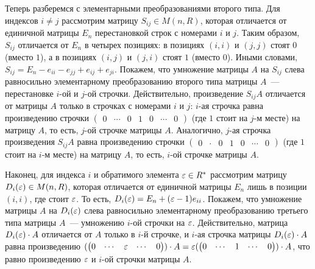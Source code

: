Теперь разберемся с элементарными преобразованиями второго
типа. Для индексов $i\neq j$ рассмотрим матрицу $S_{ij}\in M(n,R)$, которая
отличается от единичной матрицы $E_n$ перестановкой строк с номерами
$i$ и $j$. Таким образом, $S_{ij}$ отличается от $E_n$ в четырех
позициях: в позициях $(i,i)$ и $(j,j)$ стоят $0$ (вместо $1$), а в позициях $(i,j)$
и $(j,i)$ стоят $1$ (вместо $0$). Иными словами,
$S_{ij}=E_n-e_{ii}-e_{jj}+e_{ij}+e_{ji}$.
Покажем, что умножение матрицы $A$ на $S_{ij}$ слева равносильно
элементарному преобразованию второго типа матрицы $A$~--- перестановке
$i$-ой и $j$-ой строчки.
Действительно, произведение $S_{ij}A$ отличается от матрицы $A$ только
в строчках с номерами $i$ и $j$: $i$-ая строчка равна произведению
строчки $(\begin{matrix} 0 & \cdots & 0 & 1 & 0 & \cdots &
  0\end{matrix})$ (где $1$ стоит на $j$-м месте) на матрицу $A$, то
есть, $j$-ой строчке матрицы $A$. Аналогично, $j$-ая строчка
произведения $S_{ij}A$ равна произведению строчки $(\begin{matrix} 0 &
  \cdot & 0 & 1 & 0 & \cdots & 0\end{matrix})$ (где $1$ стоит на $i$-м
месте) на матрицу $A$, то есть, $i$-ой строчке матрицы $A$.

Наконец, для индекса $i$ и обратимого элемента $\varepsilon\in R^*$
рассмотрим матрицу $D_i(\varepsilon)\in M(n,R)$, которая отличается от
единичной матрицы $E_n$ лишь в позиции $(i,i)$, где стоит $\varepsilon$. То
есть, $D_i(\varepsilon)=E_n+(\varepsilon-1)e_{ii}$. Покажем, что умножение матрицы
$A$ на $D_i(\varepsilon)$ слева равносильно элементарному преобразованию
третьего типа матрицы $A$~--- умножению $i$-ой строчки на
$\varepsilon$. Действительно, матрица $D_i(\varepsilon)\cdot A$ отличается от $A$
только в $i$-й строчке, и $i$-ая строчка матрицы $D_i(\varepsilon)\cdot A$
равна произведению $(\begin{pmatrix}0 & \cdots & \varepsilon & \cdots &
  0\end{pmatrix})\cdot A=\varepsilon(\begin{pmatrix}0 & \cdots & 1 & \cdots
  & 0\end{pmatrix})\cdot A$, что равно произведению $\varepsilon$ и $i$-ой
строчки матрицы $A$.

